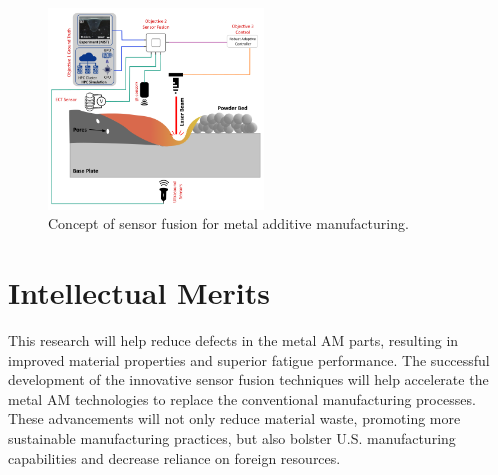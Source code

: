 \documentclass[12pt]{article}
\begin{document}
\begin{figure}[htbp]
  \centering
  \includegraphics[width=0.51\textwidth]{figures/SensorFusion.png}
  \caption{Concept of sensor fusion for metal additive manufacturing.}
  \label{fig:labelForYourFigure}
\end{figure}

\section*{Intellectual Merits}
This research will help reduce defects in the metal AM parts, resulting in improved material properties and superior fatigue performance. The successful development of the innovative sensor fusion techniques will help accelerate the metal AM technologies to replace the conventional manufacturing processes. These advancements will not only reduce material waste, promoting more sustainable manufacturing practices, but also bolster U.S. manufacturing capabilities and decrease reliance on foreign resources. 
\end{document}
